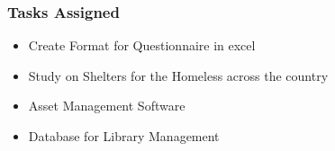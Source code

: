 \begin{frame}

\frametitle{Tasks Assigned}



\begin{itemize}
\item Create Format for Questionnaire in excel
\item Study on Shelters for the Homeless across the country
\item Asset Management Software
\item Database for Library Management

\end{itemize}

\end{frame}